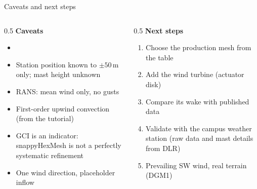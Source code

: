\documentclass[aspectratio=169,10pt]{beamer}
\newcommand{\SkewSentence}{}\newcommand{\NFinished}{0}}
\begin{document}
\begin{frame}{Caveats and next steps}
\begin{columns}[T]
\begin{column}{0.5\textwidth}\small
\textbf{Caveats}
\begin{itemize}\setlength{\itemsep}{2pt}
  \item \SkewSentence
  \item Station position known to $\pm50$\,m only; mast height unknown
  \item RANS: mean wind only, no gusts
  \item First-order upwind convection (from the tutorial)
  \item GCI is an indicator: snappyHexMesh is not a perfectly systematic refinement
  \item One wind direction, placeholder inflow
\end{itemize}
\end{column}
\begin{column}{0.5\textwidth}\small
\textbf{Next steps}
\begin{enumerate}\setlength{\itemsep}{2pt}
  \item Choose the production mesh from the table
  \item Add the wind turbine (actuator disk)
  \item Compare its wake with published data
  \item Validate with the campus weather station (raw data and mast details from DLR)
  \item Prevailing SW wind, real terrain (DGM1)
\end{enumerate}
\end{column}
\end{columns}
\end{frame}
\end{document}
